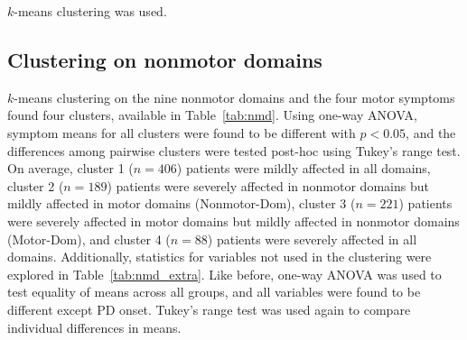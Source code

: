 \documentclass[preprint,3p]{elsarticle} %
\begin{document}
$k$-means clustering was used.

\subsection{Clustering on nonmotor domains}

$k$-means clustering on the nine nonmotor domains and the four motor symptoms found four clusters,
available in Table~\ref{tab:nmd}. Using one-way ANOVA, symptom means for all clusters were found to
be different with $p < 0.05$, and the differences among pairwise clusters were tested post-hoc
using Tukey's range test. On average, cluster 1 ($n = 406$) patients were mildly affected in all
domains, cluster 2 ($n = 189$) patients were severely affected in nonmotor domains but mildly
affected in motor domains (Nonmotor-Dom), cluster 3 ($n = 221$) patients were severely affected in
motor domains but mildly affected in nonmotor domains (Motor-Dom), and cluster 4 ($n = 88$)
patients were severely affected in all domains.
Additionally, statistics for variables not used in the clustering were explored in
Table~\ref{tab:nmd_extra}. Like before, one-way ANOVA was used to test equality of means across all
groups, and all variables were found to be different except PD onset. Tukey's range test was used
again to compare individual differences in means.
\end{document}
